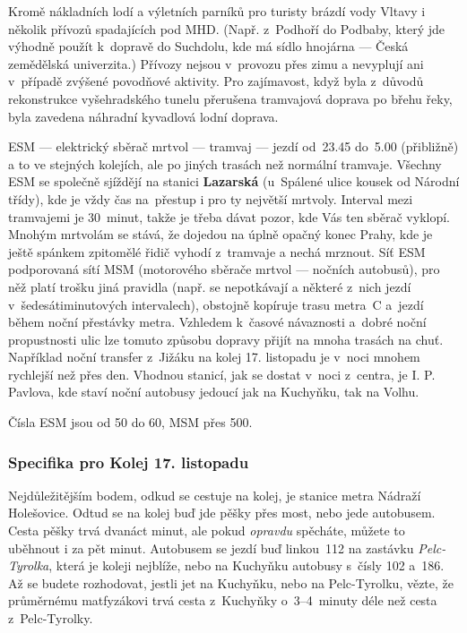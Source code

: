 
Kromě nákladních lodí a výletních parníků pro turisty brázdí vody
Vltavy i několik přívozů spadajících pod MHD. (Např. z~Podhoří do
Podbaby, který jde výhodně použít k~dopravě do Suchdolu, kde má
sídlo hnojárna --- Česká zemědělská univerzita.) Přívozy nejsou
v~provozu přes zimu a nevyplují ani v~případě zvýšené povodňové
aktivity. Pro zajímavost, když byla z~důvodů rekonstrukce
vyšehradského tunelu přerušena tramvajová doprava po břehu řeky,
byla zavedena náhradní kyvadlová lodní doprava.


ESM --- elektrický sběrač mrtvol --- tramvaj --- jezdí od~23.45
do~5.00 (přibližně) a to ve stejných kolejích, ale po jiných
trasách než normální tramvaje. Všechny ESM se společně sjíždějí na
stanici {\bf Lazarská} (u~Spálené ulice kousek od Národní třídy),
kde je vždy čas na~přestup i pro ty největší mrtvoly. Interval
mezi tramvajemi je 30~minut, takže je třeba dávat pozor, kde Vás
ten sběrač vyklopí. Mnohým mrtvolám se stává, že dojedou na úplně
opačný konec Prahy, kde je ještě spánkem zpitomělé řidič vyhodí
z~tramvaje a nechá mrznout. Síť ESM podporovaná sítí MSM
(motorového sběrače mrtvol --- nočních autobusů), pro něž platí
trošku jiná pravidla (např.  se nepotkávají a některé z~nich jezdí
v~šedesátiminutových intervalech), obstojně kopíruje trasu metra~C
a~jezdí během noční přestávky metra. Vzhledem k~časové návaznosti
a~dobré noční propustnosti ulic lze tomuto způsobu dopravy přijít
na mnoha trasách na chuť. Například noční transfer z~Jižáku na
kolej 17. listopadu je v~noci mnohem rychlejší než přes den.
Vhodnou stanicí, jak se dostat v~noci z~centra, je I. P. Pavlova,
kde staví noční autobusy jedoucí jak na Kuchyňku, tak na Volhu.

Čísla ESM jsou od 50 do 60, MSM přes 500.

\subsubsection{Specifika pro Kolej 17. listopadu}
\medskip
{}

Nejdůležitějším bodem, odkud se cestuje na kolej, je stanice metra
Nádraží Holešovice. Odtud se na kolej buď jde pěšky přes most,
nebo jede autobusem. Cesta pěšky trvá dvanáct minut, ale pokud
\emph{opravdu\/} spěcháte, můžete to uběhnout i za pět minut.
Autobusem se jezdí buď linkou~112 na zastávku \emph{Pelc-Tyrolka},
která je koleji nejblíže, nebo na Kuchyňku autobusy s~čísly 102
a~186. Až se budete rozhodovat, jestli jet na Kuchyňku, nebo na
Pelc-Tyrolku, vězte, že průměrnému matfyzákovi trvá cesta z~Kuchyňky
o~3--4~minuty déle než cesta z~Pelc-Tyrolky.

